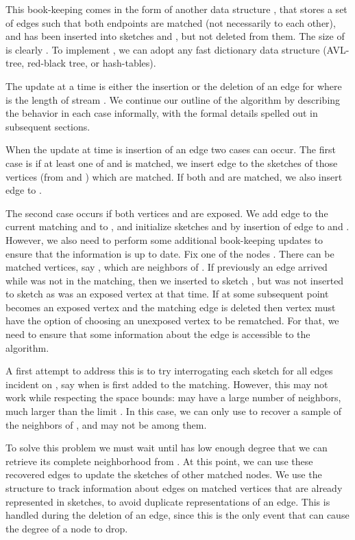 \documentclass[11pt,letter]{article}
\renewcommand{\paragraph}[1]{\medskip \noindent {\bf #1}}
\begin{document}
This book-keeping comes in the form of another
data structure , that
stores a set of edges  such that both endpoints are matched
(not necessarily to each other),
and  has been inserted into sketches  and , but not deleted from them.
The size of  is clearly .
To implement , we can adopt any fast dictionary data
structure (AVL-tree, red-black tree, or hash-tables).

The update at a time  is either the insertion or the deletion of
an edge  for  where  is
the length of stream .
We continue our outline of the algorithm by describing the behavior
in each case informally, with the formal details spelled out in
subsequent sections.

\paragraph{Insertion of an Edge  at Time .}
When the update at time  is insertion of an edge 
two cases can occur.
The first case is if at least one of  and  is matched,
we insert edge  to the sketches of those vertices (from  and )
which are matched.
If both  and  are matched, we also insert edge 
to .


The second case occurs if both vertices  and  are exposed.
We add edge  to the current matching and to , and initialize sketches 
and  by insertion of edge  to  and .
However, we also need to perform some additional book-keeping updates
to ensure that the information is up to date.
Fix one of the nodes .
There can be matched vertices, say , which are neighbors of .
If previously an edge  arrived while  was not in the
matching, then 
we inserted  to
sketch , but  was not inserted to sketch 
as  was an exposed vertex at that time.
If at some subsequent point  becomes an exposed vertex
and the matching edge  is deleted
then vertex  must have the option of
choosing an unexposed vertex  to be rematched.
For that, we need to ensure that some information about the edge
 is accessible to the algorithm.




A first attempt to address this is to try interrogating each sketch
 for all edges incident on , say when  is first added to
the matching.
However, this may not work while respecting the space bounds:
 may have a large number of neighbors, much larger than the limit
.
In this case, we can only use  to recover a sample of the
neighbors of , and  may not be among them.


To solve this problem we must wait until 
has low enough degree that we can retrieve its complete neighborhood
from .
At this point, we can use these recovered edges to update the sketches
of other matched nodes.
We use the structure  to track information about edges
on matched vertices that are already represented in sketches, to avoid
duplicate representations of an edge.
This is handled during the deletion of an edge, since this is the only
event that can cause the degree of a node  to drop.
\end{document}
